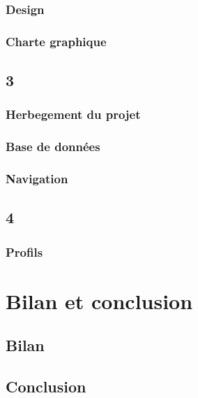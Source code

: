 \documentclass[french]{report}
\begin{document}
\subsection{Design}
\label{partie_design}

\subsection{Charte graphique}
\label{partie_charte_graphique}


\section{3\ieme{} \sprint{}}
\label{sprint3}
\subsection{Herbegement du projet}
\label{hebergement_du_projet}


\subsection{Base de données}
\label{base_de_donnees}


\subsection{Navigation}
\label{navigation}


\section{4\ieme{} \sprint{}}
\label{sprint4}
\subsection{Profils}
\label{profils}


\chapter{Bilan et conclusion}
\section{Bilan}
\label{partie_bilan}

\section{Conclusion}
\label{partie_conclusion}



\appendix 

\end{document}
